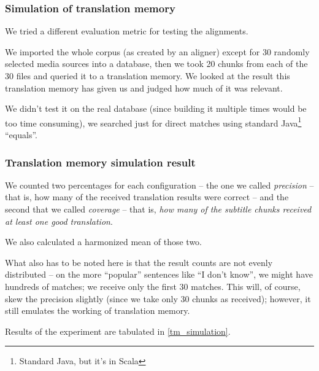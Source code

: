 \subsubsection{Simulation of translation memory}
We tried a different evaluation metric for testing the alignments.

We imported the whole corpus (as created by an aligner) except for 30 randomly selected media sources into a database, then we took 20 chunks from each of the 30 files and queried it to a translation memory. We looked at the result this translation memory has given us and judged how much of it was relevant.

We didn't test it on the real database (since building it multiple times would be too time consuming), we searched just for direct matches using standard Java\footnote{Standard Java, but it's in Scala} ``equals''.

\subsubsection{Translation memory simulation result}

We counted two percentages for each configuration -- the one we called \emph{precision} -- that is, how many of the received translation results were correct -- and the second that we called \emph{coverage} -- that is, \emph{how many of the subtitle chunks received at least one good translation}.

We also calculated a harmonized mean of those two.

What also has to be noted here is that the result counts are not evenly distributed -- on the more ``popular'' sentences like ``I don't know'', we might have hundreds of matches; we receive only the first 30 matches. This will, of course, skew the precision slightly (since we take only 30 chunks as received); however, it still emulates the working of translation memory.

Results of the experiment are tabulated in \ref{tm_simulation}.

